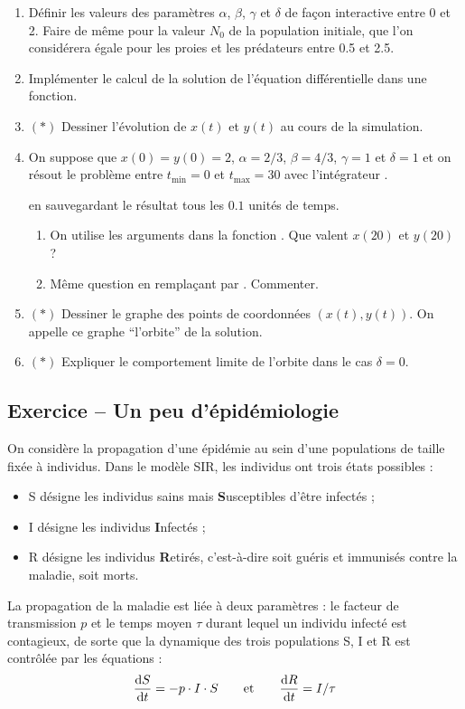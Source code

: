\documentclass{article}
\newcounter{loop}
\newcounter{numEx}
\newcommand{\exo}[1]{
	\stepcounter{numEx}
	\setcounter{loop}{0}
	\subsection*{Exercice \arabic{numEx} -- #1}
}
\begin{document}
\begin{enumerate}
	\item Définir les valeurs des paramètres $\alpha$, $\beta$, $\gamma$ et $\delta$ de façon interactive entre 0 et 2. Faire de même pour la valeur $N_0$ de la population initiale, que l'on considérera égale pour les proies et les prédateurs entre 0.5 et 2.5.
	
	\item Implémenter le calcul de la solution de l'équation différentielle dans une fonction.

	\item $(*)$ Dessiner l'évolution de $x(t)$ et $y(t)$ au cours de la simulation.

	\item On suppose que $x(0) = y(0) = 2$, $\alpha = 2/3$, $\beta = 4/3$, $\gamma=1$ et $\delta=1$ et on résout le problème entre $t_{\min} = 0$ et $t_{\max} = 30$ avec l'intégrateur .
	
	 en sauvegardant le résultat tous les $0.1$ unités de temps.
	\begin{enumerate}
		\item On utilise les arguments  dans la fonction . Que valent $x(20)$ et $y(20)$ ?
		
		\item Même question en remplaçant  par . Commenter.
	\end{enumerate}

	\item $(*)$ Dessiner le graphe des points de coordonnées $(x(t), y(t))$. On appelle ce graphe ``l'orbite'' de la solution.
	
	\item $(*)$ Expliquer le comportement limite de l'orbite dans le cas $\delta = 0$.

\end{enumerate}

\exo{Un peu d'épidémiologie}

On considère la propagation d'une épidémie au sein d'une populations de taille fixée à  individus. Dans le modèle SIR, les individus ont trois états possibles :
\begin{itemize}
	\item S désigne les individus sains mais \textbf{S}usceptibles d'être infectés ;
	\item I désigne les individus \textbf{I}nfectés ;
	\item R désigne les individus \textbf{R}etirés, c'est-à-dire soit guéris et immunisés contre la maladie, soit morts.
\end{itemize}
La propagation de la maladie est liée à deux paramètres : le facteur de transmission $p$ et le temps moyen $\tau$ durant lequel un individu infecté est contagieux, de sorte que la dynamique des trois populations S, I et R est contrôlée par les équations :
\[\frac{\text dS}{\text dt} = - p\cdot I\cdot S\qquad\text{et}\qquad\frac{\text dR}{\text dt} = I/\tau\]
\end{document}
